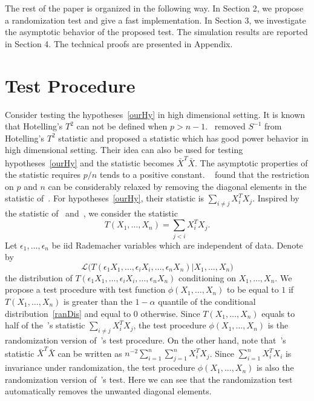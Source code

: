 \documentclass[review]{elsarticle}
\theoremstyle{plain}
\theoremstyle{definition}
\theoremstyle{remark}
\begin{document}


The rest of the paper is organized in the following way. In Section 2, we propose a randomization test and give a fast implementation.  In Section 3, we investigate the asymptotic behavior of the proposed test. The simulation results are reported in Section 4. The technical proofs are presented in Appendix.




\section{Test Procedure}
Consider testing the hypotheses~\eqref{ourHy} in high dimensional setting.
It is known that Hotelling's $T^2$ can not be defined when $p> n-1$.~\citet{Bai1996Efiect} removed $S^{-1}$ from Hotelling's $T^2$ statistic and proposed a statistic which has good power behavior in high dimensional setting.
Their idea can also be used for testing hypotheses~\eqref{ourHy} and the statistic becomes $\bar{X}^T \bar{X}$.
The asymptotic properties of the statistic requires $p/n$ tends to a positive constant.
 ~\citet{Chen2010A} found that the restriction on $p$ and $n$ can be considerably relaxed by removing the diagonal elements in the statistic of~\citet{Bai1996Efiect}.
 For hypotheses~\eqref{ourHy}, their statistic is $\sum_{i \neq j}X_i^T X_j$.
 Inspired by the statistic of~\citet{Bai1996Efiect} and~\citet{Chen2010A}, we consider the statistic
\begin{equation}\label{Statistic}
    T(X_1,\ldots,X_n)=\sum_{j<i}X_i^T X_j.
\end{equation}
Let $\epsilon_1,\ldots,\epsilon_n$ be iid Rademacher variables which are independent of data. Denote by
\begin{equation}\label{ranDis}
    \mathcal{L}\big(T(\epsilon_1 X_1,\ldots,\epsilon_i X_i,\ldots,\epsilon_n X_n)|X_1,\ldots,X_n\big)
\end{equation}
the distribution of $T(\epsilon_1 X_1,\ldots,\epsilon_i X_i,\ldots,\epsilon_n X_n)$ conditioning on $X_1,\ldots,X_n$.
We propose a test procedure with test function $\phi(X_1,\ldots,X_n)$ to be equal to $1$ if $T(X_1,\ldots, X_n)$ is greater than the $1-\alpha$ quantile of the conditional distribution~\eqref{ranDis} and equal to $0$ otherwise.
 Since $T(X_1,\ldots,X_n)$ equals to half of the~\citet{Chen2010A}'s statistic $\sum_{i\neq j}X_i^T X_j$, the test procedure $\phi(X_1,\ldots,X_n)$ is the randomization version of~\citet{Chen2010A}'s test procedure.
 On the other hand,
 note that~\citet{Bai1996Efiect}'s statistic $\bar{X}^T \bar{X}$ can be written as $n^{-2}\sum_{i=1}^n\sum_{j=1}^n X_i^T X_j$.
 Since $\sum_{i=1}^n X_i^T X_i$ is invariance under randomization, the test procedure $\phi(X_1,\ldots,X_n)$ is also the randomization version of~\citet{Bai1996Efiect}'s test.
 Here we can see that the randomization test automatically removes the unwanted diagonal elements.
\end{document}
